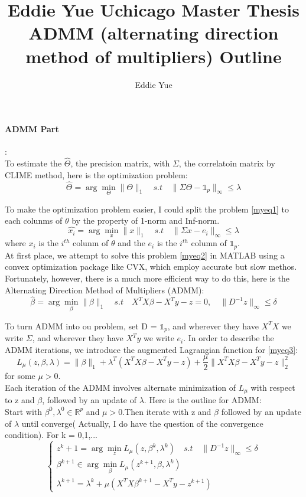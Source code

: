 \documentclass[a4paper,11pt]{article}
\author{Eddie Yue}
\title{Eddie Yue Uchicago Master Thesis \\
         \vspace{3 mm} \large ADMM (alternating direction method of multipliers) Outline}
\begin{document}
 
	\paragraph{ADMM Part}: \\
	To estimate the $\hat{\Theta}$, the precision matrix, with $\Sigma$, the correlatoin matrix by CLIME method, here is the optimization problem:
	\[
	\hat{\Theta} = \arg\!\min_\Theta \|\Theta\|_1
	\quad s.t \quad \|\Sigma\Theta - \mathds{1}_p\|_\infty \leq \lambda
	\tag{1}\label{myeq1}
	\] 
	
	To make the optimization problem easier, I could split the problem \eqref{myeq1} to each colunms of $\theta$ by the property of 1-norm and Inf-norm.
	\[ \hat{x_i} = \arg\!\min_x \|x\|_1
	\quad s.t \quad \|\Sigma{x} - e_i\|_\infty \leq \lambda
	\tag{2}\label{myeq2} \]
	where $x_i$ is the $i^{th}$ colunm of $\theta$ and the $e_i$ is the $i^{th}$ column of $\mathds{1}_p $.\\
	
	At first place, we attempt to solve this problem \eqref{myeq2} in MATLAB using a convex optimization package like CVX, which employ accurate but slow methos. Fortunately, however, there is a much more efficient way to do this, here is the Alternating Direction Method of Multipliers (ADMM):
	\[
	\hat{\beta} = \arg\!\min_\beta \|\beta\|_1
	\quad s.t \quad X^TX\beta - X^Ty - z = 0, \quad \|D^{-1}z\|_\infty \leq \delta
	\tag{3}\label{myeq3}
	\] 
	
	To turn ADMM into ou problem, set D = $\mathds{1}_p$, and wherever they have $X^TX$ we write $\Sigma$, and wherever they have $X^Ty$ we write $e_i$. In order to describe the ADMM iterations, we introduce the augmented Lagrangian function for \eqref{myeq3}:
	\[
	L_\mu(z,\beta,\lambda) = \|\beta\|_1 + \lambda^T(X^TX\beta-X^Ty- z) + \frac{\mu}{2}\|X^TX\beta-X^Ty- z\|_{2}^2
	\tag{4}\label{myeq4}
	\]
	for some $\mu > 0$. \\

	Each iteration of the ADMM involves alternate minimization of $L_\mu$ with respect to z and $\beta$, followed by an update of $\lambda$. Here is the outline for ADMM:\\
	
	Start with $\beta^0 , \lambda^0 \in \mathbb{R}^p$ and $ \mu > 0$.Then iterate with z and $\beta$ followed by an update of $\lambda$ until converge( Actually, I do have the question of the convergence condition). For k = 0,1,...
	\[\left\{
	\begin{array}{lr}
	z^k+1 = \arg\!\min_z L_\mu(z,\beta^k,\lambda^k) \quad s.t \quad \|D^{-1}z\|_\infty \leq	\delta\\
	\beta^{k+1} \in \arg\!\min_\beta L_\mu(z^{k+1},\beta,\lambda^k)\\
	\lambda^{k+1} = \lambda^k +\mu(X^TX\beta^{k+1}-X^Ty-z^{k+1})
	\end{array}
	\right.
	\tag{5}\label{myeq5}
	\]
	
\end{document}

